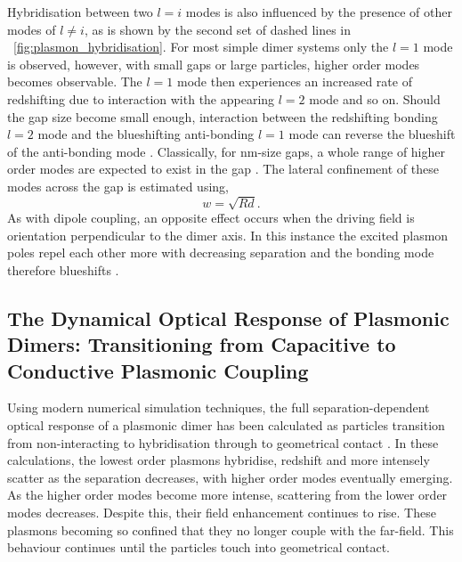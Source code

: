 \documentclass{article}
\begin{document}
Hybridisation between two $l=i$ modes is also influenced by the presence of other modes of $l \neq i$, as is shown by the second set of dashed lines in \figurename~\ref{fig:plasmon_hybridisation}. For most simple dimer systems only the $l=1$ mode is observed, however, with small gaps or large particles, higher order modes becomes observable. The $l=1$ mode then experiences an increased rate of redshifting due to interaction with the appearing $l=2$ mode {\color{red}and so on}. Should the gap size become small enough, interaction between the redshifting bonding $l=2$ mode and the blueshifting anti-bonding $l=1$ mode can reverse the blueshift of the anti-bonding mode \cite{nordlander2004}. Classically, for nm-size gaps, a whole range of higher order modes are expected to exist in the gap \cite{romero2006}. The lateral confinement of these modes across the gap is estimated using, %
\begin{equation}
	w = \sqrt{Rd}.
\end{equation}
As with dipole coupling, an opposite effect occurs when the driving field is orientation perpendicular to the dimer axis. In this instance the excited plasmon poles repel each other more with decreasing separation and the bonding mode therefore blueshifts \cite{gunnarsson2005, yang2010}.

\subsection{The Dynamical Optical Response of Plasmonic Dimers: Transitioning from Capacitive to Conductive Plasmonic Coupling}

Using modern numerical simulation techniques, the full separation-dependent optical response of a plasmonic dimer has been calculated as particles transition from non-interacting to hybridisation through to geometrical contact \cite{romero2006}. In these calculations, the lowest order plasmons hybridise, redshift and more intensely scatter as the separation decreases, with higher order modes eventually emerging. As the higher order modes become more intense, scattering from the lower order modes decreases. Despite this, their field enhancement continues to rise. These plasmons becoming so confined that they no longer couple with the far-field. This behaviour continues until the particles touch into geometrical contact.
\end{document}
